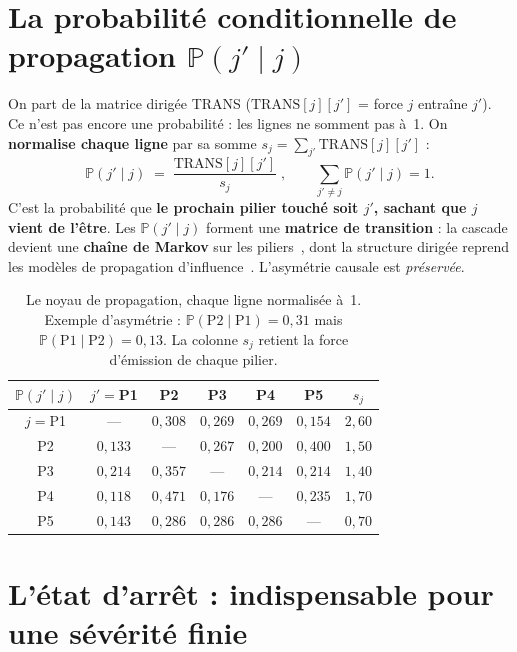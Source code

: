 \documentclass[11pt,a4paper]{article}
\begin{document}
\section{La probabilité conditionnelle de propagation $\mathbb P(j' \mid j)$}

On part de la matrice dirigée TRANS ($\text{TRANS}[j][j']$ = force \og{}$j$ entraîne $j'$\fg{}).
Ce n'est pas encore une probabilité : les lignes ne somment pas à~1. On \textbf{normalise chaque
ligne} par sa somme $s_j = \sum_{j'} \text{TRANS}[j][j']$ :
\begin{equation}
\boxed{\;\mathbb P(j' \mid j) \;=\; \frac{\text{TRANS}[j][j']}{s_j}\;,\qquad
\sum_{j'\neq j} \mathbb P(j'\mid j) = 1.\;}
\end{equation}
C'est la probabilité que \textbf{le prochain pilier touché soit $j'$, sachant que $j$ vient de
l'être}. Les $\mathbb P(j'\mid j)$ forment une \textbf{matrice de transition} : la cascade
devient une \textbf{chaîne de Markov} sur les piliers~\cite{Norris1997}, dont la structure
dirigée reprend les modèles de propagation d'influence~\cite{Pearl1988,Kempe2003}. L'asymétrie
causale est \emph{préservée}.

\begin{table}[h]\centering\small
\renewcommand{\arraystretch}{1.3}
\begin{tabular}{@{}c|ccccc|c@{}}
\toprule
$\mathbb P(j'\mid j)$ & $j'=$P1 & P2 & P3 & P4 & P5 & $s_j$ \\
\midrule
$j=$P1 & ---    & $0{,}308$ & $0{,}269$ & $0{,}269$ & $0{,}154$ & $2{,}60$ \\
P2     & $0{,}133$ & ---    & $0{,}267$ & $0{,}200$ & $0{,}400$ & $1{,}50$ \\
P3     & $0{,}214$ & $0{,}357$ & ---    & $0{,}214$ & $0{,}214$ & $1{,}40$ \\
P4     & $0{,}118$ & $0{,}471$ & $0{,}176$ & ---    & $0{,}235$ & $1{,}70$ \\
P5     & $0{,}143$ & $0{,}286$ & $0{,}286$ & $0{,}286$ & ---    & $0{,}70$ \\
\bottomrule
\end{tabular}
\caption{Le noyau de propagation, chaque ligne normalisée à~1. Exemple d'asymétrie :
$\mathbb P(\text{P2}\mid\text{P1})=0{,}31$ mais $\mathbb P(\text{P1}\mid\text{P2})=0{,}13$. La
colonne $s_j$ retient la force d'émission de chaque pilier.}
\end{table}

\section{L'état d'arrêt : indispensable pour une sévérité finie}
\end{document}
